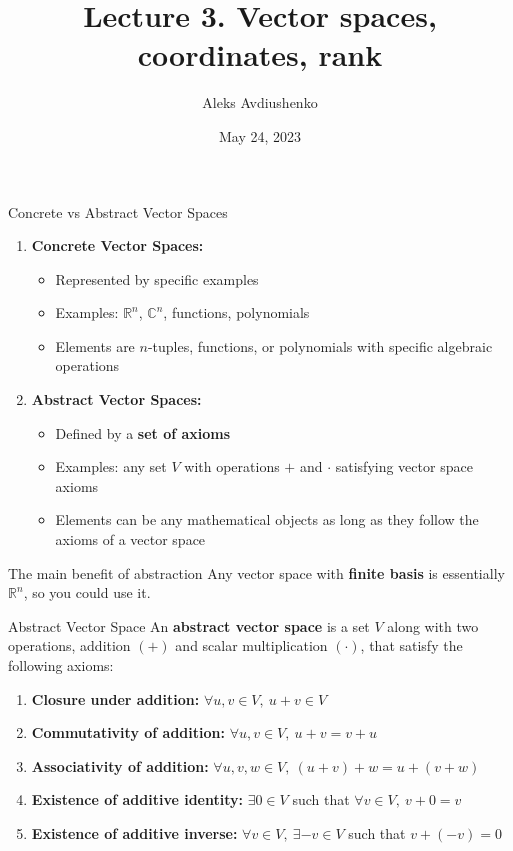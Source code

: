 \documentclass[fullscreen=true, bookmarks=true, hyperref={pdfencoding=unicode}]{beamer}
\title{Lecture 3. Vector spaces, coordinates, rank}
\author{Aleks Avdiushenko}
\institute{Neapolis University Paphos}
\date{May 24, 2023}
\begin{document}

\begin{frame}
\transdissolve[duration=0.2]
\titlepage
\end{frame}


\begin{frame}{Concrete vs Abstract Vector Spaces}
  \begin{enumerate}
    \item \textbf{Concrete Vector Spaces:}
    \begin{itemize}
      \item Represented by specific examples
      \pause  
      \item Examples: $\mathbb{R}^n$, $\mathbb{C}^n$, functions, polynomials
      \pause
      \item Elements are $n$-tuples, functions, or polynomials with specific algebraic operations
    \end{itemize}
    \pause
    \vspace{0.5cm}
    \item \textbf{Abstract Vector Spaces:}
    \begin{itemize}
      \item Defined by a \textbf{set of axioms}
      \pause
      \item Examples: any set $V$ with operations $+$ and $\cdot$ satisfying vector space axioms
      \pause
      \item Elements can be any mathematical objects as long as they follow the axioms of a vector space
    \end{itemize}
  \end{enumerate}

  \begin{block}{The main benefit of abstraction}
    Any vector space with \textbf{finite basis} is essentially $\mathbb{R}^n$, so you could use it.
  \end{block}
\end{frame}


\begin{frame}{Abstract Vector Space}
  An \textbf{abstract vector space} is a set $V$ along with two operations, addition $(+)$ and scalar multiplication $(\cdot)$, that satisfy the following axioms:
  \begin{enumerate}
    \item \textbf{Closure under addition:} $\forall u, v \in V,\ u + v \in V$
    \item \textbf{Commutativity of addition:} $\forall u, v \in V,\ u + v = v + u$
    \item \textbf{Associativity of addition:} $\forall u, v, w \in V,\ (u + v) + w = u + (v + w)$
    \item \textbf{Existence of additive identity:} $\exists 0 \in V$ such that $\forall v \in V,\ v + 0 = v$
    \item \textbf{Existence of additive inverse:} $\forall v \in V, \ \exists -v \in V$ such that $v + (-v) = 0$    
  \end{enumerate}
\end{frame}
\end{document}

